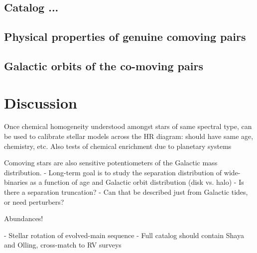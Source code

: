 \documentclass[modern, letterpaper]{aastex61}
\begin{document}
\subsection{Catalog ...}\label{sec:}



\subsection{Physical properties of genuine comoving pairs}\label{sec:}




\subsection{Galactic orbits of the co-moving pairs}\label{sec:}


\section{Discussion}

Once chemical homogeneity understood amongst stars of same spectral type, can be used to calibrate stellar models across the HR diagram: should have same age, chemistry, etc. Also tests of chemical enrichment due to planetary systems

Comoving stars are also sensitive potentiometers of the Galactic mass
distribution.
- Long-term goal is to study the separation distribution of wide-binaries as a
  function of age and Galactic orbit distribution (disk vs. halo)
    - Is there a separation truncation?
    - Can that be described just from Galactic tides, or need perturbers?



Abundances!

- Stellar rotation of evolved-main sequence
- Full catalog should contain Shaya and Olling, cross-match to RV surveys
\end{document}
